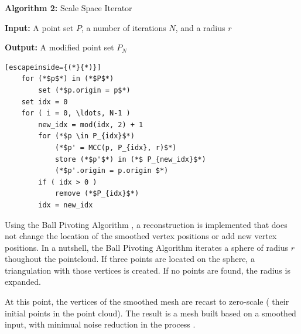 \documentclass[12pt]{drexelthesis}
\begin{document}
\textbf{Algorithm 2:} Scale Space Iterator

	\textbf{Input:} A point set $P$, a number of iterations $N$, and a radius $r$
	
	\textbf{Output:} A modified point set $P_{N}$


\begin{lstlisting}[escapeinside={(*}{*)}]
	for (*$p$*) in (*$P$*)
		set (*$p.origin = p$*)
	set idx = 0
	for ( i = 0, \ldots, N-1 )
		new_idx = mod(idx, 2) + 1
		for (*$p \in P_{idx}$*)
			(*$p' = MCC(p, P_{idx}, r)$*)
			store (*$p'$*) in (*$ P_{new_idx}$*)
			(*$p'.origin = p.origin $*)
		if ( idx > 0 )
			remove (*$P_{idx}$*)
		idx = new_idx
\end{lstlisting}

Using the Ball Pivoting Algorithm \cite{ballpivot}, a reconstruction is implemented that does not change the location of the smoothed vertex positions or add new vertex positions. In a nutshell, the Ball Pivoting Algorithm iterates a sphere of radius $r$ thoughout the pointcloud. If three points are located on the sphere, a triangulation with those vertices is created. If no points are found, the radius is expanded.

At this point, the vertices of the smoothed mesh are recast to zero-scale ( their initial points in the point cloud). The result is a mesh built based on a smoothed input, with minimual noise reduction in the process \cite{RN67}.
\end{document}
